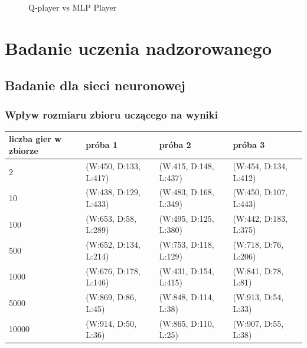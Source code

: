 \documentclass{article}
\begin{document}
\begin{figure}[H]
  \centering
  \caption{Q-player vs MLP Player}
  \label{fig:q_player_vs_mlp}
\end{figure}

\section{Badanie uczenia nadzorowanego}

\subsection{Badanie dla sieci neuronowej}

\subsubsection{Wpływ rozmiaru zbioru uczącego na wyniki}

\begin{center}
  \begin{tabular}{|l|l|l|l|}
    \hline
    liczba gier w zbiorze & próba 1 & próba 2 & próba 3 \\ \hline
    2 & (W:450, D:133, L:417) & (W:415, D:148, L:437) & (W:454, D:134, L:412) \\ \hline
    10 & (W:438, D:129, L:433) & (W:483, D:168, L:349) & (W:450, D:107, L:443) \\ \hline
    100 & (W:653, D:58, L:289) & (W:495, D:125, L:380) & (W:442, D:183, L:375) \\ \hline
    500 & (W:652, D:134, L:214) & (W:753, D:118, L:129) & (W:718, D:76, L:206) \\ \hline
    1000 & (W:676, D:178, L:146) & (W:431, D:154, L:415) & (W:841, D:78, L:81) \\ \hline
    5000 & (W:869, D:86, L:45) & (W:848, D:114, L:38) & (W:913, D:54, L:33) \\ \hline
    10000 & (W:914, D:50, L:36) & (W:865, D:110, L:25) & (W:907, D:55, L:38) \\ \hline
  \end{tabular}
\end{center}
\end{document}
